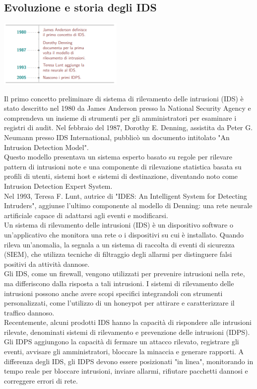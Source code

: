\documentclass[12pt,a4paper,oneside,onecolumn,openright]{book}
\begin{document}
\subsection{Evoluzione e storia degli IDS}
\begin{table}
	\includegraphics[width=0.45\textwidth]{IDStimeline.png}
\end{table} 
Il primo concetto preliminare di sistema di rilevamento delle intrusioni (IDS) 
è stato descritto nel 1980 da James Anderson presso la National Security Agency 
e comprendeva un insieme di strumenti per gli amministratori per esaminare i registri 
di audit. Nel febbraio del 1987, Dorothy E. Denning, assistita da Peter G. Neumann 
presso IDS International, pubblicò un documento intitolato "An Intrusion Detection Model".\\
Questo modello presentava un sistema esperto basato su regole per rilevare pattern 
di intrusioni note e una componente di rilevazione statistica basata su profili di 
utenti, sistemi host e sistemi di destinazione, diventando noto come Intrusion Detection 
Expert System.\\
Nel 1993, Teresa F. Lunt, autrice di "IDES: An Intelligent System for Detecting Intruders", 
aggiunse l'ultimo componente al modello di Denning: una rete neurale artificiale capace di 
adattarsi agli eventi e modificarsi. \\
Un sistema di rilevamento delle intrusioni (IDS) è un dispositivo software o un'applicativo 
che monitora una rete o i dispositivi su cui è installato. Quando rileva un'anomalia, 
la segnala a un sistema di raccolta di eventi di sicurezza (SIEM), che utilizza tecniche 
di filtraggio degli allarmi per distinguere falsi positivi da attività dannose.\\
Gli IDS, come un firewall, vengono utilizzati per prevenire intrusioni nella rete, 
ma differiscono dalla risposta a tali intrusioni. I sistemi di rilevamento delle 
intrusioni possono anche avere scopi specifici integrandoli con strumenti personalizzati, 
come l'utilizzo di un honeypot per attirare e caratterizzare il traffico dannoso.\\
Recentemente, alcuni prodotti IDS hanno la capacità di rispondere alle intrusioni 
rilevate, denominati sistemi di rilevamento e prevenzione delle intrusioni (IDPS). 
Gli IDPS aggiungono la capacità di fermare un attacco rilevato, registrare gli eventi, 
avvisare gli amministratori, bloccare la minaccia e generare rapporti. A differenza 
degli IDS, gli IDPS devono essere posizionati "in linea", monitorando in tempo reale 
per bloccare intrusioni, inviare allarmi, rifiutare pacchetti dannosi e correggere 
errori di rete.\\
\end{document}
